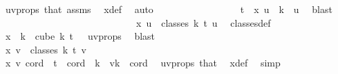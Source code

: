 \begin{isabellebody}
\ uv{\isacharunderscore}{\kern0pt}props\ that\ assms{\isacharparenleft}{\kern0pt}{}{\isacharparenright}{\kern0pt}\ \isamarkupfalse%
\ x{\isacharunderscore}{\kern0pt}def\ \isamarkupfalse%
\ auto\isanewline
\ \ \ \ \ \ \ \ \ \ \ \ \ \ \isamarkupfalse%
\ \isamarkupfalse%
\ {\isachardoublequoteopen}t\ {\isasymnotin}\ x\ u\ {\isacharbackquote}{\kern0pt}\ {\isacharbraceleft}{\kern0pt}{\isachardot}{\kern0pt}{\isachardot}{\kern0pt}{\isacharless}{\kern0pt}k\ {\isacharminus}{\kern0pt}\ u{\isacharbraceright}{\kern0pt}{\isachardoublequoteclose}\ \isamarkupfalse%
\ blast\isanewline
\ \ \ \ \ \ \ \ \ \ \ \ \isacommand{{\isacharbraceright}{\kern0pt}}\isamarkupfalse%
\isanewline
\ \ \ \ \ \ \ \ \ \ \ \ \isamarkupfalse%
\ \isamarkupfalse%
\ {\isachardoublequoteopen}x\ u\ {\isasymin}\ classes\ k\ t\ u{\isachardoublequoteclose}\ \isamarkupfalse%
\ classes{\isacharunderscore}{\kern0pt}def\ \isanewline
\ \ \ \ \ \ \ \ \ \ \ \ \ \ \isamarkupfalse%
\ {\isacartoucheopen}x\ {\isacharbackquote}{\kern0pt}\ {\isacharbraceleft}{\kern0pt}{\isachardot}{\kern0pt}{\isachardot}{\kern0pt}k{\isacharbraceright}{\kern0pt}\ {\isasymsubseteq}\ cube\ k\ {\isacharparenleft}{\kern0pt}t\ {\isacharplus}{\kern0pt}\ {}{\isacharparenright}{\kern0pt}{\isacartoucheclose}\ uv{\isacharunderscore}{\kern0pt}props\ \isamarkupfalse%
\ blast\isanewline
\ \ \ \ \ \ \ \ \ \ \isamarkupfalse%
\isanewline
\ \ \ \ \ \ \ \ \ \ \isamarkupfalse%
\ \isamarkupfalse%
\ {\isachardoublequoteopen}x\ v\ {\isasymin}\ classes\ k\ t\ v{\isachardoublequoteclose}\isanewline
\ \ \ \ \ \ \ \ \ \ \isamarkupfalse%
\ {\isacharminus}{\kern0pt}\isanewline
\ \ \ \ \ \ \ \ \ \ \ \ \isamarkupfalse%
\ {\isachardoublequoteopen}x\ v\ cord\ {\isacharequal}{\kern0pt}\ t{\isachardoublequoteclose}\ \ {\isachardoublequoteopen}cord\ {\isasymin}\ {\isacharbraceleft}{\kern0pt}k\ {\isacharminus}{\kern0pt}\ v{\isachardot}{\kern0pt}{\isachardot}{\kern0pt}{\isacharless}{\kern0pt}k{\isacharbraceright}{\kern0pt}{\isachardoublequoteclose}\ \ cord\ \isamarkupfalse%
\ uv{\isacharunderscore}{\kern0pt}props\ that\ \isamarkupfalse%
\ x{\isacharunderscore}{\kern0pt}def\ \isamarkupfalse%
\ simp\ \isanewline
\ \ \ \ \ \ \ \ \ \ \ \ \isamarkupfalse%
\ \isanewline
\ \ \ \ \ \ \ \ \ \ \ \ \isacommand{{\isacharbraceleft}{\kern0pt}}\isamarkupfalse%

\end{isabellebody}

